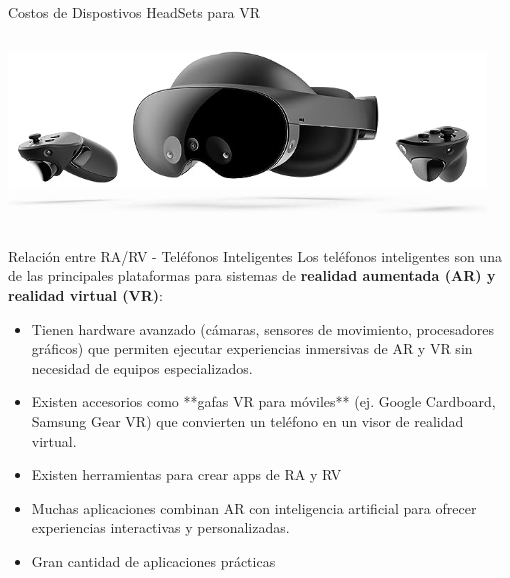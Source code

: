 \begin{frame}{Costos de Dispostivos HeadSets para VR}
\begin{columns}
\begin{column}{0.49\textwidth}
\begin{center}
\includegraphics[width=0.95\textwidth]{Figs/MetaPro.jpg}
\end{center}
\end{column}
\end{columns}
\end{frame}


\begin{frame}{Relación entre RA/RV - Teléfonos Inteligentes}
Los teléfonos inteligentes son una de las principales plataformas para sistemas de \textbf{realidad aumentada (AR) y realidad virtual (VR)}:  
\begin{itemize}
\item Tienen hardware avanzado (cámaras, sensores de movimiento, procesadores gráficos) que permiten ejecutar experiencias inmersivas de AR y VR sin necesidad de equipos especializados.  
\item Existen accesorios como **gafas VR para móviles** (ej. Google Cardboard, Samsung Gear VR) que convierten un teléfono en un visor de realidad virtual.  
\item Existen herramientas para crear apps de RA y RV
\item Muchas aplicaciones combinan AR con inteligencia artificial para ofrecer experiencias interactivas y personalizadas.  
\item Gran cantidad de aplicaciones prácticas
\end{itemize}
\end{frame}
